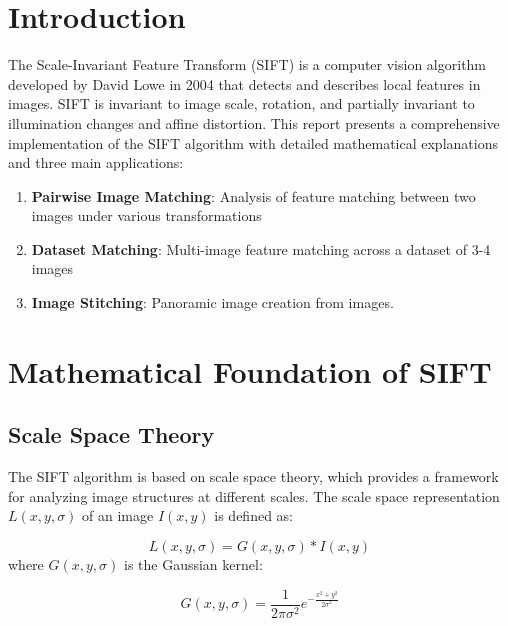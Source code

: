 \documentclass[12pt,a4paper]{article}
\begin{document}
\maketitle

\tableofcontents
\newpage

\section{Introduction}

The Scale-Invariant Feature Transform (SIFT) is a computer vision algorithm developed by David Lowe in 2004 that detects and describes local features in images. SIFT is invariant to image scale, rotation, and partially invariant to illumination changes and affine distortion. This report presents a comprehensive implementation of the SIFT algorithm with detailed mathematical explanations and three main applications:

\begin{enumerate}
    \item \textbf{Pairwise Image Matching}: Analysis of feature matching between two images under various transformations
    \item \textbf{Dataset Matching}: Multi-image feature matching across a dataset of 3-4 images
    \item \textbf{Image Stitching}: Panoramic image creation from images.
\end{enumerate}

\section{Mathematical Foundation of SIFT}

\subsection{Scale Space Theory}

The SIFT algorithm is based on scale space theory, which provides a framework for analyzing image structures at different scales. The scale space representation $L(x,y,\sigma)$ of an image $I(x,y)$ is defined as:

\begin{equation}
L(x,y,\sigma) = G(x,y,\sigma) * I(x,y)
\end{equation}
where $G(x,y,\sigma)$ is the Gaussian kernel:

\begin{equation}
G(x,y,\sigma) = \frac{1}{2\pi\sigma^2}e^{-\frac{x^2+y^2}{2\sigma^2}}
\end{equation}
\end{document}
